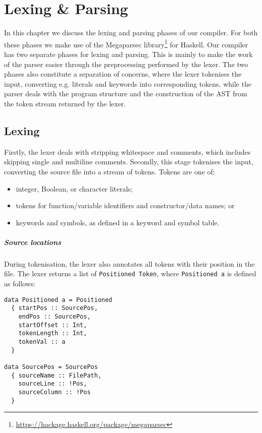 \chapter{Lexing \& Parsing} \label{chp:lexing-parsing}

In this chapter we discuss the lexing and parsing phases of our compiler.
For both these phases we make use of the Megaparsec
library\footnote{\url{https://hackage.haskell.org/package/megaparsec}} for Haskell.
%
Our compiler has two separate phases for lexing and parsing.
This is mainly to make the work of the parser easier through the preprocessing
performed by the lexer.
The two phases also constitute a separation of concerns, where the lexer
tokenises the input, converting e.g. literals and keywords into corresponding
tokens, while the parser deals with the program structure and the construction
of the AST from the token stream returned by the lexer.

\section{Lexing}
Firstly, the lexer deals with stripping whitespace and comments, which includes
skipping single and multiline comments.
Secondly, this stage tokenises the input, converting the source file into a
stream of tokens.
%
Tokens are one of:\vspace{-1mm}
\begin{itemize}[itemsep=0mm]
  \item integer, Boolean, or character literals;
  \item tokens for function/variable identifiers and constructor/data names; or
  \item keywords and symbols, as defined in a keyword and symbol table.
\end{itemize}\vspace{-4mm}

\paragraph{Source locations}
During tokenisation, the lexer also annotates all tokens with their position in
the file. The lexer returns a list of \texttt{Positioned Token},
where \texttt{Positioned a} is defined as follows:
%
\begin{verbatim}
data Positioned a = Positioned
  { startPos :: SourcePos,
    endPos :: SourcePos,
    startOffset :: Int,
    tokenLength :: Int,
    tokenVal :: a
  }

data SourcePos = SourcePos
  { sourceName :: FilePath,
    sourceLine :: !Pos,
    sourceColumn :: !Pos
  }
\end{verbatim}

